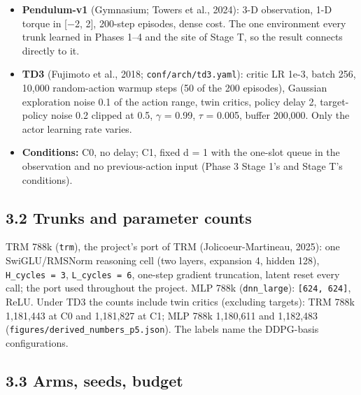 \documentclass[11pt]{article}
\begin{document}
\begin{itemize}
\item \textbf{Pendulum-v1} (Gymnasium; Towers et al., 2024): 3-D observation, 1-D torque in [$-$2, 2], 200-step episodes, dense cost. The one environment every trunk learned in Phases 1--4 and the site of Stage T, so the result connects directly to it.
\item \textbf{TD3} (Fujimoto et al., 2018; \texttt{conf/\allowbreak{}arch/\allowbreak{}td3.\allowbreak{}yaml}): critic LR 1e-3, batch 256, 10,000 random-action warmup steps (50 of the 200 episodes), Gaussian exploration noise 0.1 of the action range, twin critics, policy delay 2, target-policy noise 0.2 clipped at 0.5, $\gamma$ = 0.99, $\tau$ = 0.005, buffer 200,000. Only the actor learning rate varies.
\item \textbf{Conditions:} C0, no delay; C1, fixed d = 1 with the one-slot queue in the observation and no previous-action input (Phase 3 Stage 1's and Stage T's conditions).
\end{itemize}



\subsection*{3.2 Trunks and parameter counts}



TRM 788k (\texttt{trm}), the project's port of TRM (Jolicoeur-Martineau, 2025): one SwiGLU/RMSNorm reasoning cell (two layers, expansion 4, hidden 128), \texttt{H\_cycles = 3}, \texttt{L\_cycles = 6}, one-step gradient truncation, latent reset every call; the port used throughout the project. MLP 788k (\texttt{dnn\_large}): \texttt{[624, 624]}, ReLU. Under TD3 the counts include twin critics (excluding targets): TRM 788k 1,181,443 at C0 and 1,181,827 at C1; MLP 788k 1,180,611 and 1,182,483 (\texttt{figures/\allowbreak{}derived\_\allowbreak{}numbers\_\allowbreak{}p5.\allowbreak{}json}). The labels name the DDPG-basis configurations.



\subsection*{3.3 Arms, seeds, budget}
\end{document}
